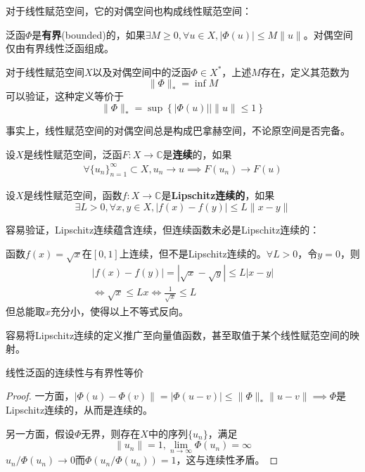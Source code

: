 \documentclass{ctexbook}
\begin{document}
对于线性赋范空间，它的对偶空间也构成线性赋范空间：
\begin{definition}[对偶空间的范数]
    泛函$\Phi$是\textbf{有界}(bounded)的，如果$\exists M\geq 0,\forall u\in X,|\Phi(u)|\leq M\|u\|$。对偶空间仅由有界线性泛函组成。

    对于线性赋范空间$X$以及对偶空间中的泛函$\Phi\in X^*$，上述$M$存在，定义其范数为
    \[\|\Phi\|_*=\inf M\]
    可以验证，这种定义等价于
    \[\|\Phi\|_*=\sup\left\{|\Phi(u)|\left|\|u\|\leq 1\right.\right\}\]
\end{definition}

事实上，线性赋范空间的对偶空间总是构成巴拿赫空间，不论原空间是否完备。

\begin{definition}[泛函的连续性]
    设$X$是线性赋范空间，泛函$F:X\to\mathbb{C} $是\textbf{连续}的，如果\begin{align*}
        \forall \{u_n\}_{n=1}^{\infty}\subset X,u_n\to u\implies F(u_n)\to F(u)
    \end{align*}
\end{definition}

\begin{definition}[Lipschitz连续]
    设$X$是线性赋范空间，函数$f:X\to \mathbb{C} $是\textbf{Lipschitz连续的}，如果
    $$\exists L>0,\forall x,y\in X,|f(x)-f(y)|\leq L\|x-y\|$$
\end{definition}

容易验证，Lipschitz连续蕴含连续，但连续函数未必是Lipschitz连续的：
\begin{example}
    函数$f(x)=\sqrt{x}$在$[0,1]$上连续，但不是Lipschitz连续的。$\forall L>0$，令$y=0$，则
    \begin{align*}
        |f(x)-f(y)|=|\sqrt{x}-\sqrt{y}|\leq L|x-y|\\
        \iff \sqrt{x}\leq Lx \iff \frac{1}{\sqrt{x}}\leq L
    \end{align*}
    但总能取$x$充分小，使得以上不等式反向。
\end{example}

容易将Lipschitz连续的定义推广至向量值函数，甚至取值于某个线性赋范空间的映射。

\begin{proposition}
    线性泛函的连续性与有界性等价
\end{proposition}
\begin{proof}
    一方面，$|\Phi(u)-\Phi(v)\|=|\Phi(u-v)|\leq\|\Phi\|_*\|u-v\|\implies$$\Phi$是Lipschitz连续的，从而是连续的。

    另一方面，假设$\Phi$无界，则存在$X$中的序列$\{u_n\}$，满足
    $$\|u_n\|=1,\lim_{n\to \infty}\Phi(u_n)=\infty$$
    $u_n/\Phi(u_n)\to 0$而$\Phi(u_n/\Phi(u_n))=1$，这与连续性矛盾。
\end{proof}
\end{document}
